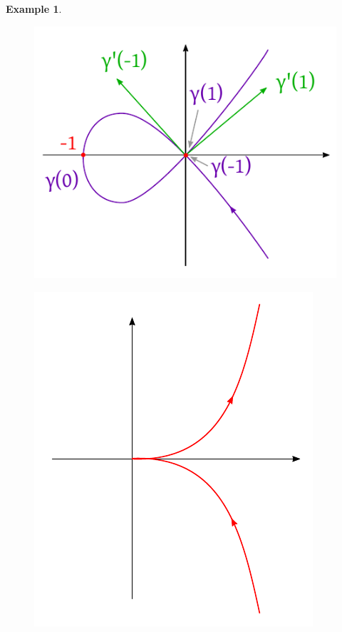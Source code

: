\documentclass{article}
\newtheorem{example}{Example}  \numberwithin{example}{section}
\begin{document}
\begin{example}
\begin{figure}[p]
\begin{minipage}{.5\textwidth}
      \label{img:ex1b}
    \end{minipage}
    \begin{minipage}{.5\textwidth}
      \centering
      \includegraphics[width=.9\linewidth]{img/53a_example.pdf}
      \label{img:examp}
    \end{minipage}
    \begin{minipage}{.5\textwidth}
      \centering
      \includegraphics[width=.9\linewidth]{img/53b_example.pdf}
      \label{img:example}
    \end{minipage}
  \end{figure}


\end{example}
\end{document}
